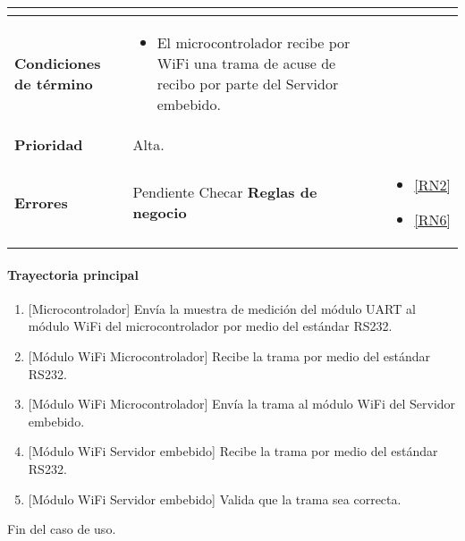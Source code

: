 \begin{longtable}{|J{5cm}|J{10.3cm}|}
\begin{itemize}
		\end{itemize} \\ \hline
	\textbf{Condiciones de término} & 
		\begin{itemize}
		    \item El microcontrolador recibe por WiFi una trama de acuse de recibo por parte del Servidor embebido.
		\end{itemize} 
		\\ \hline 
	\textbf{Prioridad} & 
		Alta. \\ \hline
	\textbf{Errores} & Pendiente Checar
		 \hline
	\textbf{Reglas de negocio} & 
	    \begin{itemize}
	      \item  \ref{RN2}
	      \item  \ref{RN6}
		 \end{itemize}%
		 \hline
\end{longtable}

\paragraph{Trayectoria principal}
\label{SUB-M-CU1.4:TP}
	\begin{enumerate}
	    \item {[Microcontrolador]} Envía la muestra de medición del módulo UART al módulo WiFi del microcontrolador por medio del estándar RS232.
	    \item {[Módulo WiFi Microcontrolador]} Recibe la trama por medio del estándar RS232.
	    \item {[Módulo WiFi Microcontrolador]} Envía la trama al módulo WiFi del Servidor embebido.
	    \item {[Módulo WiFi Servidor embebido]} Recibe la trama por medio del estándar RS232.
	    \item {[Módulo WiFi Servidor embebido]} Valida que la trama sea correcta. %
	\end{enumerate}
	Fin del caso de uso.

